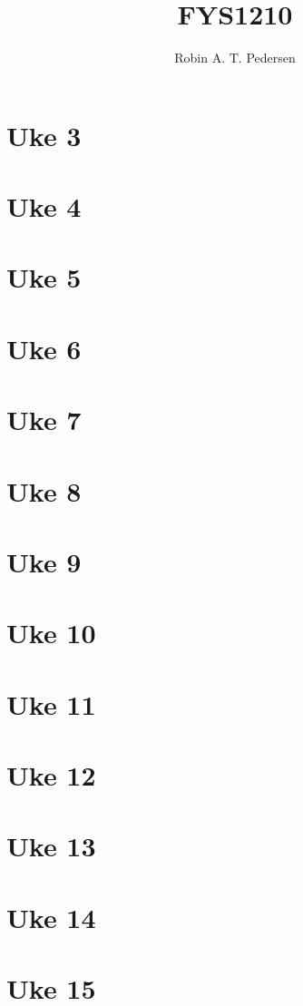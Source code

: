\documentclass{article}
\begin{document}
  \title{FYS1210}
  \author{Robin A. T. Pedersen}
  \maketitle
  \tableofcontents

  \section{Uke 3}
    

  \section{Uke 4}
  \section{Uke 5}
  \section{Uke 6}
  \section{Uke 7}
  \section{Uke 8}
  \section{Uke 9}
  \section{Uke 10}
  \section{Uke 11}
  \section{Uke 12}
  \section{Uke 13}
  \section{Uke 14}
  \section{Uke 15}
\end{document}
